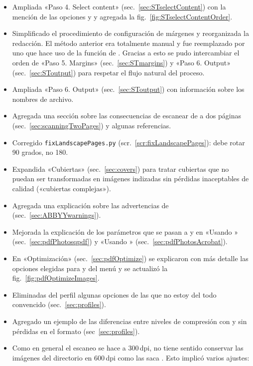 \documentclass[%
	a5paper,
	10pt,
	twoside,
	openright,
	final,
]{memoir}
\begin{document}
{\begin{itemize}
		\item Ampliada «Paso 4. Select content» (sec.~\ref{sec:STselectContent}) con la mención de las opciones  y  y agregada la fig.~\ref{fig:STselectContentOrder}.
		\item Simplificado el procedimiento de configuración de márgenes y reorganizada la redacción. El método anterior era totalmente manual y fue reemplazado por uno que hace uso de la función  de \scantailor. Gracias a esto se pudo intercambiar el orden de «Paso 5. Margins» (sec.~\ref{sec:STmargins}) y «Paso 6. Output» (sec.~\ref{sec:SToutput}) para respetar el flujo natural del proceso.
		\item Ampliada «Paso 6. Output» (sec.~\ref{sec:SToutput}) con información sobre los nombres de archivo.
		\item Agregada una sección sobre las consecuencias de escanear de a dos páginas (sec.~\ref{sec:scanningTwoPages}) y algunas referencias.
		\item Corregido \texttt{fixLandscapePages.py} (scr.~\ref{scr:fixLandscapePages}): debe rotar 90 grados, no 180.
		\item Expandida «Cubiertas» (sec.~\ref{sec:covers}) para tratar cubiertas que no puedan ser transformadas en imágenes indizadas sin pérdidas inaceptables de calidad («cubiertas complejas»).
		\item Agregada una explicación sobre las advertencias de \abbyy (sec.~\ref{sec:ABBYYwarnings}).
		\item Mejorada la explicación de los parámetros que se pasan a \qpdf y \acrobat en «Usando \qpdf» (sec.~\ref{sec:pdfPhotosqpdf}) y «Usando \acrobat» (sec.~\ref{sec:pdfPhotosAcrobat}).
		\item En «Optimización» (sec.~\ref{sec:pdfOptimize}) se explicaron con más detalle las opciones elegidas para  y  del menú  y se actualizó la fig.~\ref{fig:pdfOptimizeImages}.
		\item Eliminadas del perfil  algunas opciones de las que no estoy del todo convencido (sec.~\ref{sec:profiles}).
		\item Agregado un ejemplo de las diferencias entre niveles de compresión con y sin pérdidas en el formato \djvu (sec~\ref{sec:profiles}).
		\item Como en general el escaneo se hace a 300\,dpi, no tiene sentido conservar las imágenes del directorio  en 600\,dpi como las saca \scantailor. Esto implicó varios ajustes:

\end{itemize}}
\end{document}
